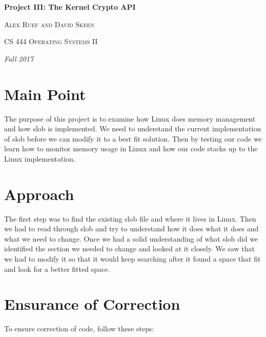 \documentclass[10pt,drafclsnofoot,onecolumn]{article}
\begin{document}
               
\begin{titlepage}
\centering
{\huge\bfseries Project III: The Kernel Crypto API\par}
\vspace{.5cm}
{\scshape Alex Ruef and David Skeen \par}
\vspace{.5cm}   
{\scshape CS 444 Operating Systems II\par}
\vspace{.5cm} 
{\Large\itshape Fall 2017\par}
\par
\par
\begin{abstract}

\end{abstract}
\end{titlepage}

\section{Main Point}
The purpose of this project is to examine how Linux does memory management and how slob is implemented.
We need to understand the current implementation of slob before we can modify it to a best fit solution.
Then by testing our code we learn how to monitor memory usage in Linux and how our code stacks up to the Linux implementation.

\section{Approach}
The first step was to find the existing slob file and where it lives in Linux.
Then we had to read through slob and try to understand how it does what it does and what we need to change.
Once we had a solid understanding of what slob did we identified the section we needed to change and looked at it closely.
We saw that we had to modify it so that it would keep searching after it found a space that fit and look for a better fitted space.

\section{Ensurance of Correction}
To ensure correction of code, follow these steps:
\end{document}
